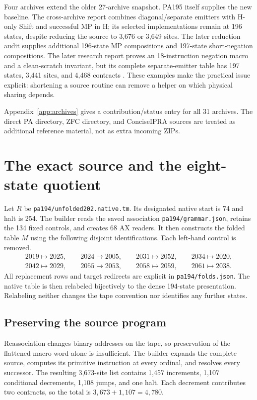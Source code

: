 \documentclass[11pt,letterpaper]{article}
\newcommand{\file}[1]{\texttt{\nolinkurl{#1}}}
\begin{document}
Four archives extend the older 27-archive snapshot. PA195 itself supplies
the new baseline. The cross-archive report combines diagonal/separate
emitters with H-only Shift and successful MP in H; its selected
implementations remain at 196 states, despite reducing the source to
3,676 or 3,649 sites. The later reduction audit supplies additional
196-state MP compositions and 197-state short-negation compositions.
The later research report proves an 18-instruction negation macro and a
clean-scratch invariant, but its complete separate-emitter table has
197 states, 3,441 sites, and 4,468 contracts \cite{cross,audit,neg18}.
These examples make the practical issue explicit: shortening a source
routine can remove a helper on which physical sharing depends.

Appendix~\ref{app:archives} gives a contribution/status entry for all
31 archives. The direct PA directory, ZFC directory, and ConciseIPRA
sources are treated as additional reference material, not as extra
incoming ZIPs.

\section{The exact source and the eight-state quotient}
\label{sec:quotient}
Let $R$ be \file{pa194/unfolded202.native.tm}. Its designated native
start is 74 and halt is 254. The builder reads the saved association
\file{pa194/grammar.json}, retains the 134 fixed controls, and creates
68 AX readers. It then constructs the folded table $M$ using the
following disjoint identifications. Each left-hand control is removed.
\[
\begin{gathered}
2019\mapsto2025,\qquad2024\mapsto2005,\qquad2031\mapsto2052,\qquad
2034\mapsto2020,\\
2042\mapsto2029,\qquad2055\mapsto2053,\qquad2058\mapsto2059,\qquad
2061\mapsto2038.
\end{gathered}
\]
All replacement rows and target redirects are explicit in
\file{pa194/folds.json}. The native table is then relabeled bijectively
to the dense 194-state presentation. Relabeling neither changes the
tape convention nor identifies any further states.

\subsection{Preserving the source program}
Reassociation changes binary addresses on the tape, so preservation of
the flattened macro word alone is insufficient. The builder expands
the complete source, computes its primitive instruction at every
ordinal, and resolves every successor. The resulting 3,673-site list
contains 1,457 increments, 1,107 conditional decrements, 1,108 jumps,
and one halt. Each decrement contributes two contracts, so the total is
$3,673+1,107=4,780$.
\end{document}
